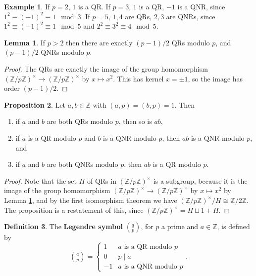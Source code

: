 \documentclass{article}
\newcommand{\Z}{\mathbb{Z}}
\newcommand{\rb}[1]{\left( #1 \right)}
\newcommand{\unit}[1]{\rb{\Z / #1\Z}^\times}
\newcommand{\legendre}[2]{\rb{\tfrac{#1}{#2}}}
\theoremstyle{definition}\newtheorem{definition}{Definition}
\theoremstyle{definition}\newtheorem*{remark}{Remark}
\theoremstyle{definition}\newtheorem*{example}{Example}
\theoremstyle{definition}\newtheorem*{note}{Note}
\newtheorem{proposition}[definition]{Proposition}
\newtheorem{lemma}[definition]{Lemma}
\begin{document}
\begin{example}
If $ p = 2 $, $ 1 $ is a QR. If $ p = 3 $, $ 1 $ is a QR, $ -1 $ is a QNR, since $ 1^2 \equiv \rb{-1}^2 \equiv 1 \mod 3 $. If $ p = 5 $, $ 1, 4 $ are QRs, $ 2, 3 $ are QNRs, since $ 1^2 \equiv \rb{-1}^2 \equiv 1 \mod 5 $ and $ 2^2 \equiv 3^2 \equiv 4 \mod 5 $.
\end{example}

\begin{lemma}
\label{lem:34}
If $ p > 2 $ then there are exactly $ \rb{p - 1} / 2 $ QRs modulo $ p $, and $ \rb{p - 1} / 2 $ QNRs modulo $ p $.
\end{lemma}

\begin{proof}
The QRs are exactly the image of the group homomorphism $ \unit{p} \to \unit{p} $ by $ x \mapsto x^2 $. This has kernel $ x = \pm 1 $, so the image has order $ \rb{p - 1} / 2 $.
\end{proof}

\begin{proposition}
\label{prop:35}
Let $ a, b \in \Z $ with $ \rb{a, p} = \rb{b, p} = 1 $. Then
\begin{enumerate}
\item if $ a $ and $ b $ are both QRs modulo $ p $, then so is $ ab $,
\item if $ a $ is a QR modulo $ p $ and $ b $ is a QNR modulo $ p $, then $ ab $ is a QNR modulo $ p $, and
\item if $ a $ and $ b $ are both QNRs modulo $ p $, then $ ab $ is a QR modulo $ p $.
\end{enumerate}
\end{proposition}

\begin{proof}
Note that the set $ H $ of QRs in $ \unit{p} $ is a subgroup, because it is the image of the group homomorphism $ \unit{p} \to \unit{p} $ by $ x \mapsto x^2 $ by Lemma \ref{lem:34}, and by the first isomorphism theorem we have $ \unit{p} / H \cong \Z / 2\Z $. The proposition is a restatement of this, since $ \unit{p} = H \sqcup 1 + H $.
\end{proof}

\begin{definition}
The \textbf{Legendre symbol} $ \legendre{a}{p} $, for $ p $ a prime and $ a \in \Z $, is defined by
$$ \legendre{a}{p} = \begin{cases} 1 & a \text{ is a QR modulo } p \\ 0 & p \mid a \\ -1 & a \text{ is a QNR modulo } p \end{cases}. $$
\end{definition}
\end{document}
